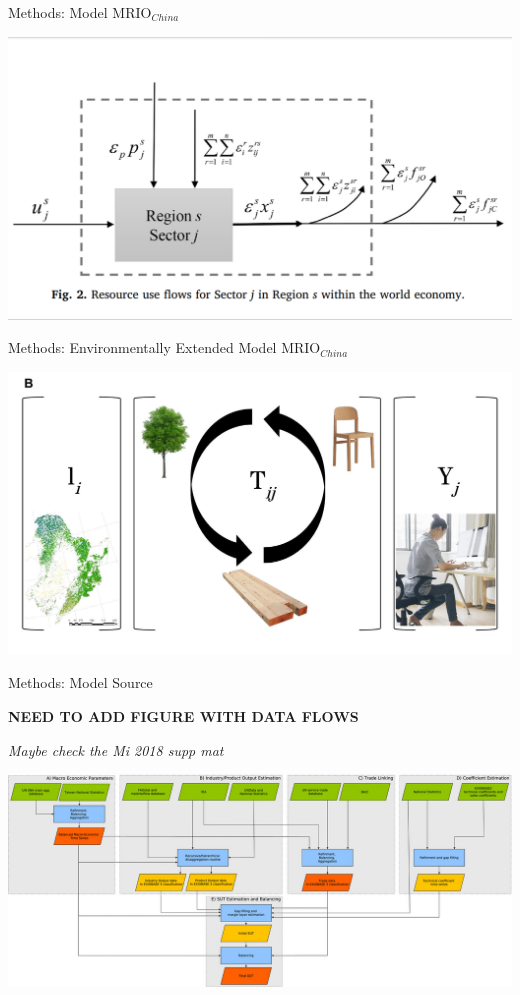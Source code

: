 \documentclass[ignorenonframetext,]{beamer}
\begin{document}
\begin{frame}{Methods: Model MRIO\(_{China}\)}
\protect\hypertarget{methods-model-mrio_china-1}{}

\begin{center}\includegraphics[width=0.5\linewidth]{images/Wu_2018_Fig2} \end{center}

\end{frame}

\begin{frame}{Methods: Environmentally Extended Model MRIO\(_{China}\)}
\protect\hypertarget{methods-environmentally-extended-model-mrio_china}{}

\begin{center}\includegraphics[width=0.5\linewidth]{images/china_eemrio} \end{center}

\end{frame}

\begin{frame}{Methods: Model Source}
\protect\hypertarget{methods-model-source}{}

\textbf{NEED TO ADD FIGURE WITH DATA FLOWS}

\emph{Maybe check the Mi 2018 supp mat}

\begin{center}\includegraphics[width=0.5\linewidth]{images/exiobase3} \end{center}

\end{frame}
\end{document}
